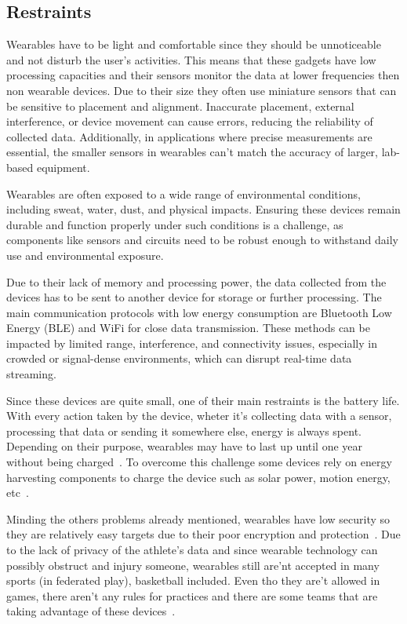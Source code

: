 \subsection{Restraints}
\label{ssec:restraints}

Wearables have to be light and comfortable since they should be unnoticeable and not disturb the user's activities. This means that these gadgets have low processing capacities 
and their sensors monitor the data at lower frequencies then non wearable devices. Due to their size they often use miniature sensors that can be sensitive to placement and alignment. 
Inaccurate placement, external interference, or device movement can cause errors, reducing the reliability of collected data. Additionally, in applications where precise measurements 
are essential, the smaller sensors in wearables can't match the accuracy of larger, lab-based equipment.

Wearables are often exposed to a wide range of environmental conditions, including sweat, water, dust, and physical impacts. Ensuring these devices remain durable and function properly 
under such conditions is a challenge, as components like sensors and circuits need to be robust enough to withstand daily use and environmental exposure.

Due to their lack of memory and processing power, the data collected from the devices has to be sent to another device for storage or further processing. The main communication protocols 
with low energy consumption are Bluetooth Low Energy (BLE) and WiFi for close data transmission. These methods can be impacted by limited range, interference, and connectivity issues, 
especially in crowded or signal-dense environments, which can disrupt real-time data streaming.

Since these devices are quite small, one of their main restraints is the battery life. With every action taken by the device, wheter it's collecting data with a sensor, processing that data or sending it 
somewhere else, energy is always spent. Depending on their purpose, wearables may have to last up until one year without being charged~\cite{challengesWearables}. To overcome this challenge 
some devices rely on energy harvesting components to charge the device such as solar power, motion energy, etc~\cite{embedding}.

Minding the others problems already mentioned, wearables have low security so they are relatively easy targets due to their poor encryption and protection~\cite{wearablesAndIOT}.
Due to the lack of privacy of the athlete's data and since wearable technology can possibly obstruct and injury someone, wearables still are'nt accepted in many sports 
(in federated play), basketball included. Even tho they are't allowed in games, there aren't any rules for practices and there are some teams that are taking advantage of these 
devices~\cite{NBPAWearables, hawksWear}.


